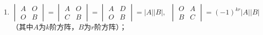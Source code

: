 \begin{enumerate}
    \item $\begin{vmatrix}
                  A & O \\ O & B
              \end{vmatrix} = \begin{vmatrix}
                  A & O \\ C & B
              \end{vmatrix} = \begin{vmatrix}
                  A & D \\ O & B
              \end{vmatrix} = |A||B|,\enspace\begin{vmatrix}
                  O & A \\ B & C
              \end{vmatrix} = (-1)^{kr}|A||B|$（其中$A$为$k$阶方阵，$B$为$r$阶方阵）；


\end{enumerate}
